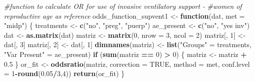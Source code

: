 \documentclass[
]{article}
\newenvironment{Shaded}{\begin{snugshade}}{\end{snugshade}}
\newcommand{\CommentTok}[1]{\textcolor[rgb]{0.56,0.35,0.01}{\textit{#1}}}
\newcommand{\ControlFlowTok}[1]{\textcolor[rgb]{0.13,0.29,0.53}{\textbf{#1}}}
\newcommand{\DataTypeTok}[1]{\textcolor[rgb]{0.13,0.29,0.53}{#1}}
\newcommand{\DecValTok}[1]{\textcolor[rgb]{0.00,0.00,0.81}{#1}}
\newcommand{\FloatTok}[1]{\textcolor[rgb]{0.00,0.00,0.81}{#1}}
\newcommand{\KeywordTok}[1]{\textcolor[rgb]{0.13,0.29,0.53}{\textbf{#1}}}
\newcommand{\NormalTok}[1]{#1}
\newcommand{\OperatorTok}[1]{\textcolor[rgb]{0.81,0.36,0.00}{\textbf{#1}}}
\newcommand{\OtherTok}[1]{\textcolor[rgb]{0.56,0.35,0.01}{#1}}
\newcommand{\StringTok}[1]{\textcolor[rgb]{0.31,0.60,0.02}{#1}}
\begin{document}
\begin{Shaded}
\begin{Highlighting}[]
\CommentTok{#function to calculate OR for use of invasive ventilatory support -}
\CommentTok{#women of reproductive age as reference}
\NormalTok{odds_function_supvent1 <-}\StringTok{ }\ControlFlowTok{function}\NormalTok{(dat, }\DataTypeTok{met =} \StringTok{"midp"}\NormalTok{) \{}
\NormalTok{  treatments <-}\StringTok{ }\KeywordTok{c}\NormalTok{(}\StringTok{"no"}\NormalTok{, }\StringTok{"preg"}\NormalTok{, }\StringTok{"puerp"}\NormalTok{)}
\NormalTok{  ae_present <-}\StringTok{ }\KeywordTok{c}\NormalTok{(}\StringTok{"no"}\NormalTok{, }\StringTok{"yes inv"}\NormalTok{)}
\NormalTok{  dat <-}\StringTok{ }\KeywordTok{as.matrix}\NormalTok{(dat)}
\NormalTok{  matriz <-}\StringTok{ }\KeywordTok{matrix}\NormalTok{(}\DecValTok{0}\NormalTok{, }\DataTypeTok{nrow =} \DecValTok{3}\NormalTok{, }\DataTypeTok{ncol =} \DecValTok{2}\NormalTok{)}
\NormalTok{  matriz[, }\DecValTok{1}\NormalTok{] <-}\StringTok{ }\NormalTok{dat[, }\DecValTok{3}\NormalTok{]}
\NormalTok{  matriz[, }\DecValTok{2}\NormalTok{] <-}\StringTok{ }\NormalTok{dat[, }\DecValTok{1}\NormalTok{]}
  \KeywordTok{dimnames}\NormalTok{(matriz) <-}\StringTok{ }\KeywordTok{list}\NormalTok{(}\StringTok{"Groups"}\NormalTok{ =}\StringTok{ }\NormalTok{treatments,}
                           \StringTok{"Var Present"}\NormalTok{ =}\StringTok{ }\NormalTok{ae_present)}
  \ControlFlowTok{if}\NormalTok{ (}\KeywordTok{sum}\NormalTok{(matriz }\OperatorTok{==}\StringTok{ }\DecValTok{0}\NormalTok{) }\OperatorTok{>}\StringTok{ }\DecValTok{0}\NormalTok{) \{}
\NormalTok{    matriz <-}\StringTok{ }\NormalTok{matriz }\OperatorTok{+}\StringTok{ }\FloatTok{0.5}
\NormalTok{  \}}
\NormalTok{  or_fit <-}\StringTok{ }\KeywordTok{oddsratio}\NormalTok{(matriz, }\DataTypeTok{correction =} \OtherTok{TRUE}\NormalTok{, }\DataTypeTok{method =}\NormalTok{ met, }\DataTypeTok{conf.level =} \DecValTok{1}\OperatorTok{-}\KeywordTok{round}\NormalTok{(}\FloatTok{0.05}\OperatorTok{/}\DecValTok{3}\NormalTok{,}\DecValTok{4}\NormalTok{))}
  \KeywordTok{return}\NormalTok{(or_fit)}
\NormalTok{\}}


\end{Highlighting}
\end{Shaded}
\end{document}
